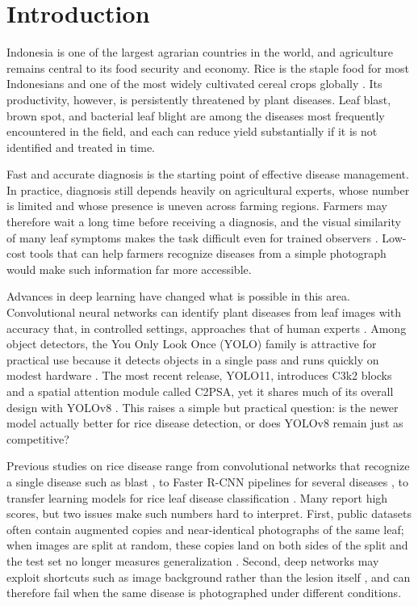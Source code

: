\documentclass[conference,a4paper]{IEEEtran}
\begin{document}
\section{Introduction}

Indonesia is one of the largest agrarian countries in the world, and agriculture remains central to its food security and economy. Rice is the staple food for most Indonesians and one of the most widely cultivated cereal crops globally \cite{sethy2020}. Its productivity, however, is persistently threatened by plant diseases. Leaf blast, brown spot, and bacterial leaf blight are among the diseases most frequently encountered in the field, and each can reduce yield substantially if it is not identified and treated in time.

Fast and accurate diagnosis is the starting point of effective disease management. In practice, diagnosis still depends heavily on agricultural experts, whose number is limited and whose presence is uneven across farming regions. Farmers may therefore wait a long time before receiving a diagnosis, and the visual similarity of many leaf symptoms makes the task difficult even for trained observers \cite{ferentinos2018}. Low-cost tools that can help farmers recognize diseases from a simple photograph would make such information far more accessible.

Advances in deep learning have changed what is possible in this area. Convolutional neural networks can identify plant diseases from leaf images with accuracy that, in controlled settings, approaches that of human experts \cite{mohanty2016,ferentinos2018}. Among object detectors, the You Only Look Once (YOLO) family is attractive for practical use because it detects objects in a single pass and runs quickly on modest hardware \cite{redmon2016}. The most recent release, YOLO11, introduces C3k2 blocks and a spatial attention module called C2PSA, yet it shares much of its overall design with YOLOv8 \cite{hidayatullah2025,khanam2024}. This raises a simple but practical question: is the newer model actually better for rice disease detection, or does YOLOv8 remain just as competitive?

Previous studies on rice disease range from convolutional networks that recognize a single disease such as blast \cite{liang2019}, to Faster R-CNN pipelines for several diseases \cite{zhou2019}, to transfer learning models for rice leaf disease classification \cite{altabaji2024}. Many report high scores, but two issues make such numbers hard to interpret. First, public datasets often contain augmented copies and near-identical photographs of the same leaf; when images are split at random, these copies land on both sides of the split and the test set no longer measures generalization \cite{barz2020,kapoor2023}. Second, deep networks may exploit shortcuts such as image background rather than the lesion itself \cite{geirhos2020,noyan2022}, and can therefore fail when the same disease is photographed under different conditions.
\end{document}
